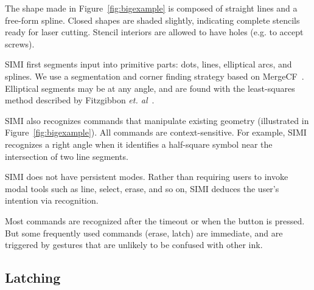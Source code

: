 \documentclass{chi-ext}
\begin{document}
The shape made in Figure~\ref{fig:bigexample} is composed of straight
lines and a free-form spline. Closed shapes are shaded slightly,
indicating complete stencils ready for laser cutting. Stencil
interiors are allowed to have holes (e.g. to accept screws).

SIMI first segments input into primitive parts: dots, lines,
elliptical arcs, and splines. We use a segmentation and corner finding
strategy based on MergeCF~\cite{wolin-smr}. Elliptical segments may be
at any angle, and are found with the least-squares method described by
Fitzgibbon \textit{et. al}~\cite{fitzgibbon-ellipse-fitting}.

SIMI also recognizes commands that manipulate existing geometry
(illustrated in Figure~\ref{fig:bigexample}). All commands are
context-sensitive. For example, SIMI recognizes a right angle when it
identifies a half-square symbol near the intersection of two line
segments.

SIMI does not have persistent modes. Rather than requiring users to
invoke modal tools such as line, select, erase, and so on, SIMI
deduces the user's intention via recognition.

Most commands are recognized after the timeout or when the button is
pressed. But some frequently used commands (erase, latch) are
immediate, and are triggered by gestures that are unlikely to be
confused with other ink.

\subsection{Latching}

\end{document}
